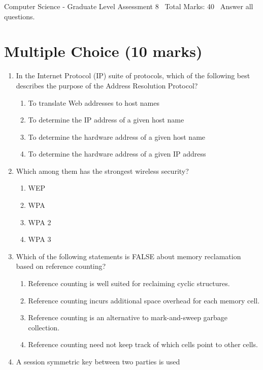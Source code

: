 \documentclass[12pt]{article}
\begin{document}
\begin{center}
Computer Science - Graduate Level Assessment 8 \
Total Marks: 40 \
Answer all questions.
\end{center}

\section*{Multiple Choice (10 marks)}
\begin{enumerate}[label=\arabic*.]
\item In the Internet Protocol (IP) suite of protocols, which of the following best describes the purpose of the Address Resolution Protocol?
\begin{enumerate}[label=(\alph*)]
    \item To translate Web addresses to host names
    \item To determine the IP address of a given host name
    \item To determine the hardware address of a given host name
    \item To determine the hardware address of a given IP address
\end{enumerate}
\item Which among them has the strongest wireless security?
\begin{enumerate}[label=(\alph*)]
    \item WEP
    \item WPA
    \item WPA 2
    \item WPA 3
\end{enumerate}
\item Which of the following statements is FALSE about memory reclamation based on reference counting?
\begin{enumerate}[label=(\alph*)]
    \item Reference counting is well suited for reclaiming cyclic structures.
    \item Reference counting incurs additional space overhead for each memory cell.
    \item Reference counting is an alternative to mark-and-sweep garbage collection.
    \item Reference counting need not keep track of which cells point to other cells.
\end{enumerate}
\item A session symmetric key between two parties is used
\begin{enumerate}[label=(\alph*)]

\end{enumerate}
\end{enumerate}
\end{document}
